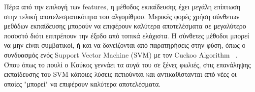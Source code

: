 
Πέρα από την επιλογή των features, η μέθοδος εκπαίδευσης έχει μεγάλη
επίπτωση στην τελική αποτελεσματικότητα του αλγορίθμου. Μερικές φορές
χρήση σύνθετων μεθόδων εκπαίδευσης μπορούν να επιφέρουν καλύτερα
αποτελέσματα σε μεγαλύτερο ποσοστό διότι επιτρέπουν την έξοδο από
τοπικά ελάχιστα. Η σύνθετες μέθοδοι μπορεί να μην είναι συμβατικοί, ή
και να δανείζονται από παρατηρήσεις στην φύση, όπως ο συνδυασμός ενός
Support Vector Machine (SVM) με τον Cuckoo Algorithm
~. Όπου όπως το πουλί ο Κούκος γεννάει τα αυγά του σε
ξένες φωλιές, στις επανάληψης εκπαίδευσης του SVM κάποιες λύσεις
πετιούνται και αντικαθίστανται από νέες οι οποίες "μπορεί" να
επιφέρουν καλύτερα αποτελέσματα.

